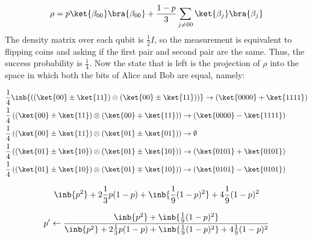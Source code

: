 \documentclass[12pt,a4paper]{article}
\begin{document}
\begin{equation*}
  \begin{split}
    \rho = p\ket{\beta_{00}}\bra{\beta_{00}} + \frac{1-p}{3}\sum_{j\neq 00}{\ket{\beta_{j}}\bra{\beta_{j} }}
  \end{split}
\end{equation*}
The density matrix over each qubit is $\frac{1}{2}I$, so the measurement is equivalent to flipping coins and asking if the first pair and second pair are the same. Thus, the success probability is $\frac{1}{4}$. Now the state that is left is the projection of $\rho$ into the space in which both the bits of Alice and Bob are equal, namely: 


\begin{equation*}
  \begin{split}
    & \frac{1}{4} \inb{ \left(  \left(\ket{00} \pm \ket{11} \right) \otimes \left(\ket{00} \pm \ket{11} \right) \right) }  \rightarrow \left( \ket{0000} + \ket{1111} \right)  \\ 
    & \frac{1}{4}  \left(  \left(\ket{00} \pm \ket{11} \right) \otimes \left(\ket{00} \mp \ket{11} \right) \right)  \rightarrow \left( \ket{0000} - \ket{1111} \right)  \\ 
    & \frac{1}{4}  \left(  \left(\ket{00} \pm \ket{11} \right) \otimes \left(\ket{01} \pm \ket{01} \right) \right)  \rightarrow \emptyset  \\ 
    & \frac{1}{4}  \left(  \left(\ket{01} \pm \ket{10} \right) \otimes \left(\ket{01} \pm \ket{10} \right) \right)  \rightarrow \left( \ket{0101} + \ket{0101} \right)  \\ 
    & \frac{1}{4}  \left(  \left(\ket{01} \pm \ket{10} \right) \otimes \left(\ket{01} \mp \ket{10} \right) \right)  \rightarrow \left( \ket{0101} - \ket{0101} \right)  
  \end{split}
\end{equation*}


\begin{equation*}
  \begin{split}
    \inb{p^2} + 2\frac{1}{3} p(1-p)+ \inb{\frac{1}{9}(1-p)^2} + 4\frac{1}{9}(1-p)^2 
  \end{split}
\end{equation*}


\begin{equation*}
  \begin{split}
    p^\prime \leftarrow \frac{ \inb{p^2} + \inb{\frac{1}{9}(1-p)^2} }{ \inb{p^2} + 2\frac{1}{3} p(1-p)+\inb{ \frac{1}{9}(1-p)^2} + 4\frac{1}{9}(1-p)^2  }
  \end{split}
\end{equation*}
\end{document}
